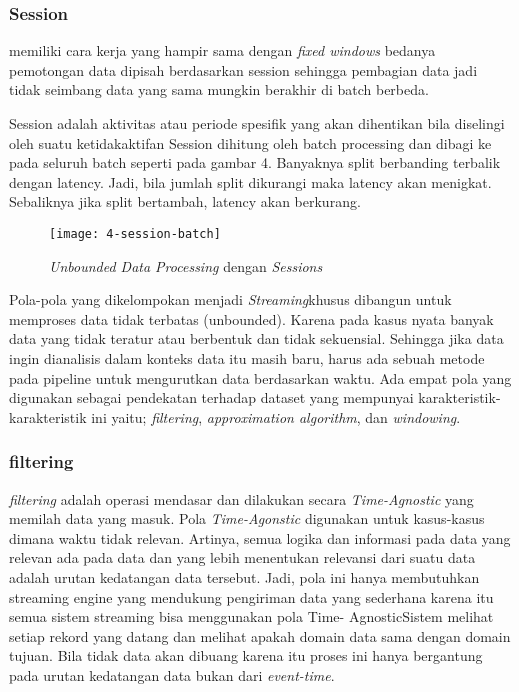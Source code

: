 	
	\subsubsection{Session} 
	memiliki cara kerja yang hampir sama dengan \textit{fixed windows} bedanya pemotongan data 
	dipisah berdasarkan session sehingga pembagian data jadi tidak seimbang data yang sama
	mungkin berakhir di batch berbeda.
	
	Session adalah aktivitas atau periode spesifik yang akan dihentikan bila diselingi oleh 		
	suatu ketidakaktifan  Session dihitung oleh batch processing dan dibagi ke pada seluruh 		
	batch seperti pada gambar 4. Banyaknya split berbanding terbalik dengan latency. Jadi, 			
	bila jumlah split dikurangi maka latency akan menigkat. Sebaliknya jika split 					
	bertambah, latency akan berkurang.
		
		\begin{figure}[H] 
		\centering  
		\texttt{[image: 4-session-batch]}  
		\caption[Gambar {\it Session-batch}]{{\it Unbounded Data Processing} dengan 					
		\textit{Sessions}} 
		\label{fig:processing-events relationship} 
		\end{figure} 
	

Pola-pola yang dikelompokan menjadi \textit{Streaming}khusus dibangun untuk memproses data tidak terbatas (unbounded). Karena pada kasus nyata banyak data yang tidak teratur atau berbentuk dan tidak sekuensial. Sehingga jika data ingin dianalisis dalam konteks data itu masih baru, harus ada sebuah metode pada pipeline untuk mengurutkan data berdasarkan waktu. Ada empat pola yang digunakan sebagai pendekatan terhadap dataset yang mempunyai karakteristik-karakteristik ini yaitu; \textit{filtering}, \textit{approximation algorithm}, dan \textit{windowing}.


	\subsubsection{filtering}
	\textit{filtering} adalah operasi mendasar dan dilakukan secara \textit{Time-Agnostic} yang 
	memilah data yang masuk. Pola \textit{Time-Agonstic} digunakan untuk kasus-kasus dimana waktu 
	tidak relevan. Artinya, semua logika dan informasi pada data yang relevan ada pada data dan 
	yang lebih menentukan relevansi dari suatu data adalah urutan kedatangan data 
	tersebut. Jadi, pola ini hanya membutuhkan streaming engine yang mendukung pengiriman 
	data yang sederhana karena itu semua sistem streaming bisa menggunakan pola Time-
	AgnosticSistem melihat setiap rekord yang datang dan melihat apakah domain data 	
	sama dengan domain tujuan. Bila tidak data akan dibuang karena itu proses ini hanya 			
	bergantung pada urutan kedatangan data bukan dari \textit{event-time}.
	
